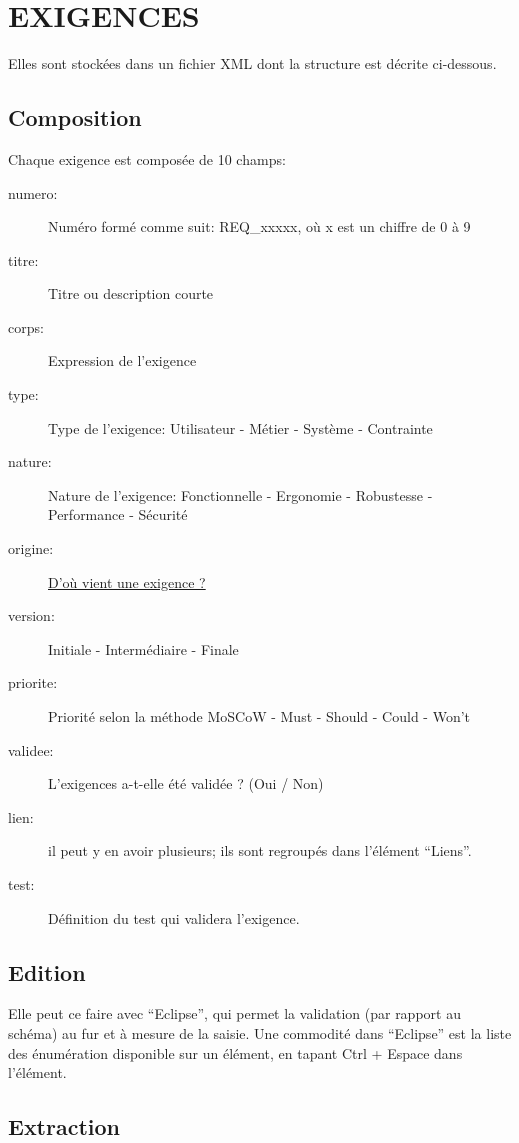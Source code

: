 \documentclass[11pt,a4paper,french,twoside,openright]{article}
\begin{document}
\section{EXIGENCES}\label{exigences}
Elles sont stockées dans un fichier XML dont la structure est décrite ci-dessous.
\subsection{Composition}\label{composition}
Chaque exigence est composée de 10 champs:
\begin{description}
\item[numero:] Numéro formé comme suit: REQ\_xxxxx, où x est un chiffre de 0 à 9
\item[titre:] Titre ou description courte
\item[corps:] Expression de l'exigence
\item[type:] Type de l'exigence: Utilisateur - Métier - Système - Contrainte
\item[nature:] Nature de l'exigence: Fonctionnelle - Ergonomie - Robustesse - Performance - Sécurité
\item[origine:] \href{https://fr.wikipedia.org/wiki/Gestion_des_exigences}{D'où vient une exigence ?}
\item[version:] Initiale - Intermédiaire - Finale
\item[priorite:] Priorité selon la méthode MoSCoW - Must - Should - Could - Won't
\item[validee:] L'exigences a-t-elle été validée ? (Oui / Non)
\item[lien:] il peut y en avoir plusieurs; ils sont regroupés dans l'élément ``Liens''.
\item[test:] Définition du test qui validera l'exigence.
\end{description}

\subsection{Edition}\label{edition}

Elle peut ce faire avec \enquote{Eclipse}, qui permet la validation (par
rapport au schéma) au fur et à mesure de la saisie. Une commodité dans
\enquote{Eclipse} est la liste des énumération disponible sur un élément, en
tapant Ctrl + Espace dans l'élément.

\subsection{Extraction}\label{extraction}
\end{document}
